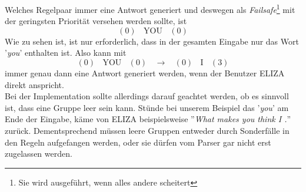 \documentclass[12pt,twoside]{article}
\theoremstyle{plain}
\theoremstyle{definition}
\theoremstyle{remark}
\begin{document}
Welches Regelpaar immer eine Antwort generiert und deswegen als \textit{Failsafe}\footnote{Sie wird ausgeführt, wenn alles andere scheitert} mit der geringsten Priorität versehen werden sollte, ist
\[
	(0)~~~~\text{YOU}~~~~(0)
\]
Wie zu sehen ist, ist nur erforderlich, dass in der gesamten Eingabe nur das Wort '\textit{you}' enthalten ist.
Also kann mit
\[
	(0)~~~~\text{YOU}~~~~(0)~~~~\longrightarrow~~~~(0)~~~~\text{I}~~~~(3)
\]
immer genau dann eine Antwort generiert werden, wenn der Benutzer ELIZA direkt anspricht.\\
Bei der Implementation sollte allerdings darauf geachtet werden, ob es sinnvoll ist, dass eine Gruppe leer sein kann.
Stünde bei unserem Beispiel das '\textit{you}' am Ende der Eingabe, käme von ELIZA beispielsweise ''\textit{What makes you think I .}'' zurück.
Dementsprechend müssen leere Gruppen entweder durch Sonderfälle in den Regeln aufgefangen werden, oder sie dürfen vom Parser gar nicht erst zugelassen werden.
\end{document}
